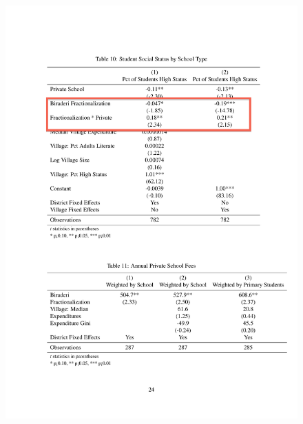 \documentclass{beamer}
\begin{document}
\begin{frame}{}
	\begin{figure}[htb]
		\begin{center}
		\includegraphics[scale=0.7]{tables/social_status_type_box1.pdf}
		\end{center}
	\end{figure}
\end{frame}
\end{document}
